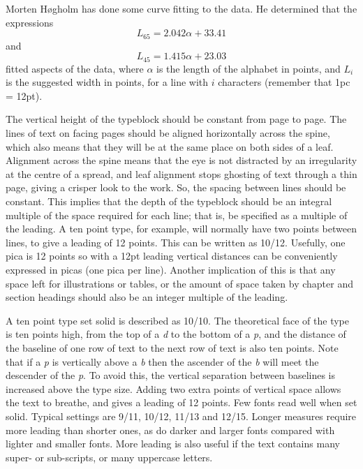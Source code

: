 \documentclass[10pt,a4paper,extrafontsizes]{memoir}
\begin{document}
\begin{paracol}{2}
\switchEng
    Morten H{\o}gholm has done some curve fitting
to the data. He determined that the expressions
\begin{equation}
L_{65} = 2.042\alpha + 33.41 \label{eq:L65}
\end{equation}
and
\begin{equation}
L_{45} = 1.415\alpha + 23.03 \label{eq:L45}
\end{equation}
fitted aspects of the data, where $\alpha$ is the length of the alphabet
in points, and $L_{i}$ is the suggested width in points, for a line with
$i$ characters (remember that 1pc = 12pt).

   The vertical height of the typeblock should be constant from page to
page. The lines of text on facing pages should be aligned
horizontally across the spine, which also means that they will be at
the same place on both sides of a leaf. Alignment across the spine
means that the eye is not distracted by an irregularity at the centre
of a spread, and leaf alignment stops ghosting of text through a thin page,
giving a crisper look to the work. 
So, the spacing between lines should
be constant. This implies that the depth of the typeblock should be an
integral multiple of the space required for each line; that is, be specified
as a multiple of the leading. A ten point type, for example, will normally
have two points between lines, to give a leading of 12 points. This can be
written as 10/12. Usefully, one pica is 12 points so with a 12pt leading
vertical distances can be conveniently expressed in picas 
(one pica per line). Another implication of this is that any space left 
for illustrations or tables, or
the amount of space taken by chapter and section headings 
should also be
an integer multiple of the leading.

    A ten point type set solid is described as 10/10. The theoretical
face of the type is ten points high, from the top of a \emph{d} to the bottom
of a \emph{p}, and the distance of the baseline of one row of text to the
next row of text is also ten points. Note that if a \emph{p} is vertically
above a \emph{b} then the ascender of the \emph{b} will meet the descender
of the \emph{p}. To avoid this, the vertical separation between baselines 
is increased above the type size. Adding two extra points of vertical space
allows the text to breathe, and gives a leading of 12 points. Few fonts
read well when set solid. Typical settings are 9/11, 10/12, 11/13 and 12/15.
Longer measures require more leading than shorter ones, as do darker 
and larger
fonts compared with lighter and smaller fonts. More leading is also
useful if the text contains many super- or 
sub-scripts, or many uppercase letters.
\end{paracol}
\end{document}
